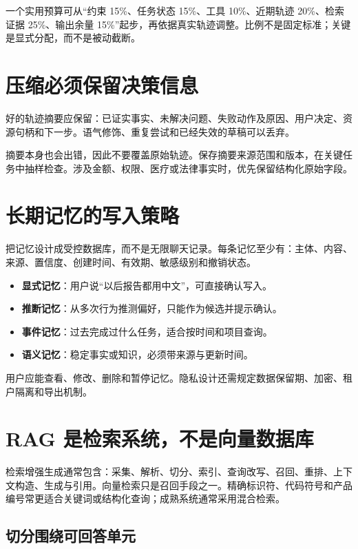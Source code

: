 一个实用预算可从“约束 15\%、任务状态 15\%、工具 10\%、近期轨迹 20\%、检索证据 25\%、输出余量 15\%”起步，再依据真实轨迹调整。比例不是固定标准；关键是显式分配，而不是被动截断。

\section{压缩必须保留决策信息}

好的轨迹摘要应保留：已证实事实、未解决问题、失败动作及原因、用户决定、资源句柄和下一步。语气修饰、重复尝试和已经失效的草稿可以丢弃。

摘要本身也会出错，因此不要覆盖原始轨迹。保存摘要来源范围和版本，在关键任务中抽样检查。涉及金额、权限、医疗或法律事实时，优先保留结构化原始字段。

\section{长期记忆的写入策略}

把记忆设计成受控数据库，而不是无限聊天记录。每条记忆至少有：主体、内容、来源、置信度、创建时间、有效期、敏感级别和撤销状态。

\begin{itemize}
  \item \textbf{显式记忆}：用户说“以后报告都用中文”，可直接确认写入。
  \item \textbf{推断记忆}：从多次行为推测偏好，只能作为候选并提示确认。
  \item \textbf{事件记忆}：过去完成过什么任务，适合按时间和项目查询。
  \item \textbf{语义记忆}：稳定事实或知识，必须带来源与更新时间。
\end{itemize}

用户应能查看、修改、删除和暂停记忆。隐私设计还需规定数据保留期、加密、租户隔离和导出机制。

\section{RAG 是检索系统，不是向量数据库}

检索增强生成通常包含：采集、解析、切分、索引、查询改写、召回、重排、上下文构造、生成与引用。向量检索只是召回手段之一。精确标识符、代码符号和产品编号常更适合关键词或结构化查询；成熟系统通常采用混合检索。

\subsection{切分围绕可回答单元}

